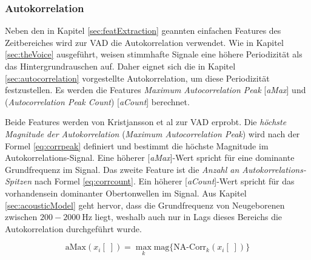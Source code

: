 

\subsubsection{Autokorrelation}

Neben den in Kapitel \ref{sec:featExtraction} geannten \glqq einfachen\grqq{} Features des Zeitbereiches  wird zur VAD die Autokorrelation verwendet. Wie in Kapitel \ref{sec:theVoice} ausgeführt, weisen stimmhafte Signale eine höhere Periodizität als das Hintergrundrauschen auf. Daher eignet sich die in Kapitel \ref{sec:autocorrelation} vorgestellte Autokorrelation, um diese Periodizität festzustellen. Es werden die Features \emph{Maximum Autocorrelation Peak} [\emph{aMax}] und (\emph{Autocorrelation Peak Count}) [\emph{aCount}] berechnet. 

Beide Features werden von Kristjansson et al \cite[S. 1 - 2]{vad_Lisboa} zur VAD erprobt. Die \emph{höchste Magnitude der Autokorrelation }  (\emph{Maximum Autocorrelation Peak}) wird nach der Formel \ref{eq:corrpeak} definiert und bestimmt die höchste Magnitude im Autokorrelations-Signal. Eine höherer [\emph{aMax}]-Wert spricht für eine dominante Grundfrequenz im Signal. Das zweite Feature ist die \emph{Anzahl an Autokorrelations-Spitzen} nach Formel \ref{eq:corrcount}. Ein höherer [\emph{aCount}]-Wert spricht für das vorhandensein dominanter Obertonwellen im Signal. Aus Kapitel \ref{sec:acousticModel} geht hervor, dass die Grundfrequenz von Neugeborenen zwischen $200 - \SI{2000}{\hertz}$ liegt, weshalb auch nur in Lags dieses Bereichs die Autokorrelation durchgeführt wurde.

\begin{equation}
\text{aMax}(x_i[\;]) = \max_{k}\text{mag}\{\text{NA-Corr}_k(x_i[\;])\}
\label{eq:corrpeak}
\end{equation}

